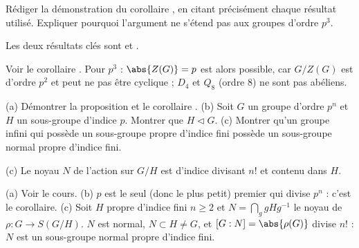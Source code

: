 \begin{exo}
Rédiger la démonstration du corollaire , en citant précisément chaque résultat utilisé. Expliquer pourquoi l'argument ne s'étend pas aux groupes d'ordre $p^3$.
\begin{indication}
Les deux résultats clés sont  et .
\end{indication}
\begin{corrige}
Voir le corollaire . Pour $p^3$ : $\abs{Z(G)}=p$ est alors possible, car $G/Z(G)$ est d'ordre $p^2$ et peut ne pas être cyclique ; $D_4$ et $Q_8$ (ordre 8) ne sont pas abéliens.
\end{corrige}
\end{exo}

\begin{exo}
(a) Démontrer la proposition  et le corollaire . (b) Soit $G$ un groupe d'ordre $p^n$ et $H$ un sous-groupe d'indice $p$. Montrer que $H\lhd G$. (c) Montrer qu'un groupe infini qui possède un sous-groupe propre d'indice fini possède un sous-groupe normal propre d'indice fini.
\begin{indication}
(c) Le noyau $N$ de l'action sur $G/H$ est d'indice divisant $n!$ et contenu dans $H$.
\end{indication}
\begin{corrige}
(a) Voir le cours. (b) $p$ est le seul (donc le plus petit) premier qui divise $p^n$ : c'est le corollaire. (c) Soit $H$ propre d'indice fini $n\ge2$ et $N=\bigcap_ggHg^{-1}$ le noyau de $\rho:G\to S(G/H)$. $N$ est normal, $N\subset H\neq G$, et $[G:N]=\abs{\rho(G)}$ divise $n!$ : $N$ est un sous-groupe normal propre d'indice fini.
\end{corrige}
\end{exo}


